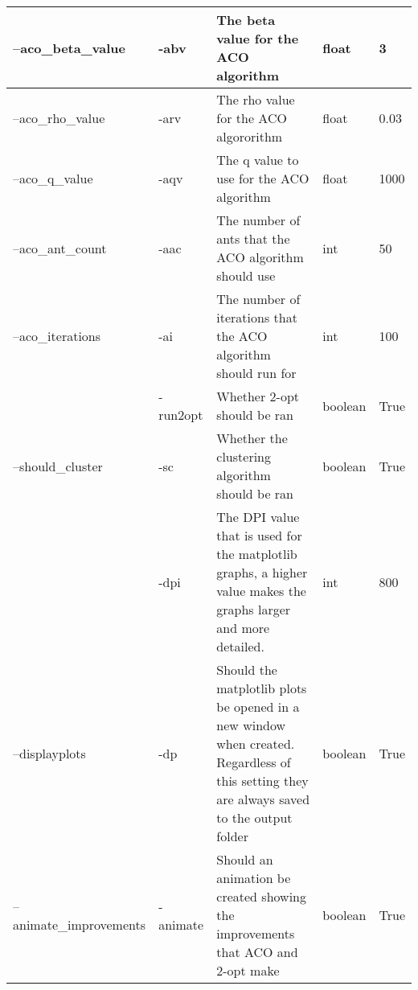 \begin{center}
\begin{longtable}{|p{4cm}|p{1cm}|p{5cm}|p{1.5cm}|p{1cm}|}
--aco\_beta\_value &
  -abv &
  The beta value for the ACO algorithm &
  float &
  3 \\ \hline
--aco\_rho\_value &
  -arv &
  The rho value for the ACO algororithm &
  float &
  0.03 \\ \hline
--aco\_q\_value &
  -aqv &
  The q value to use for the ACO algorithm &
  float &
  1000 \\ \hline
--aco\_ant\_count &
  -aac &
  The number of ants that the ACO algorithm should use &
  int &
  50 \\ \hline
--aco\_iterations &
  -ai &
  The number of iterations that the ACO algorithm should run for &
  int &
  100 \\ \hline
 &
  -run2opt &
  Whether 2-opt should be ran &
  boolean &
  True \\ \hline
--should\_cluster &
  -sc &
  Whether the clustering algorithm should be ran &
  boolean &
  True \\ \hline
 &
  -dpi &
  The DPI value that is used for the matplotlib graphs, a higher value makes the graphs larger and more detailed. &
  int &
  800 \\ \hline
--displayplots &
  -dp &
  Should the matplotlib plots be opened in a new window when created. Regardless of this setting they are always saved to the output folder &
  boolean &
  True \\ \hline
  --animate\_improvements &
  -animate &
  Should an animation be created showing the improvements that ACO and 2-opt make&
  boolean &
  True \\ \hline
\end{longtable}
\end{center}